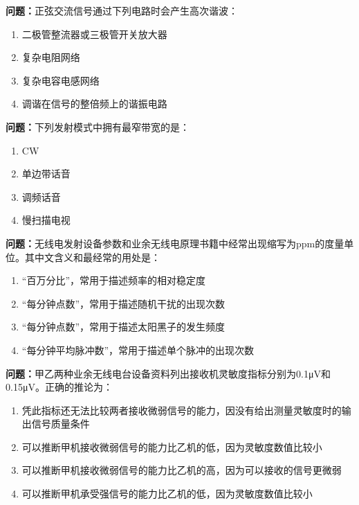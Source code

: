 \bigskip


\noindent\textbf{问题：}正弦交流信号通过下列电路时会产生高次谐波：
\begin{enumerate}[label=\Alph*), leftmargin=3em]
\item 二极管整流器或三极管开关放大器
\item 复杂电阻网络
\item 复杂电容电感网络
\item 调谐在信号的整倍频上的谐振电路
\end{enumerate}

\bigskip


\noindent\textbf{问题：}下列发射模式中拥有最窄带宽的是：
\begin{enumerate}[label=\Alph*), leftmargin=3em]
\item CW
\item 单边带话音
\item 调频话音
\item 慢扫描电视
\end{enumerate}

\bigskip


\noindent\textbf{问题：}无线电发射设备参数和业余无线电原理书籍中经常出现缩写为ppm的度量单位。其中文含义和最经常的用处是：
\begin{enumerate}[label=\Alph*), leftmargin=3em]
\item “百万分比”，常用于描述频率的相对稳定度
\item “每分钟点数”，常用于描述随机干扰的出现次数
\item “每分钟点数”，常用于描述太阳黑子的发生频度
\item “每分钟平均脉冲数”，常用于描述单个脉冲的出现次数
\end{enumerate}

\bigskip


\noindent\textbf{问题：}甲乙两种业余无线电台设备资料列出接收机灵敏度指标分别为0.1μV和0.15μV。正确的推论为：
\begin{enumerate}[label=\Alph*), leftmargin=3em]
\item 凭此指标还无法比较两者接收微弱信号的能力，因没有给出测量灵敏度时的输出信号质量条件
\item 可以推断甲机接收微弱信号的能力比乙机的低，因为灵敏度数值比较小
\item 可以推断甲机接收微弱信号的能力比乙机的高，因为可以接收的信号更微弱
\item 可以推断甲机承受强信号的能力比乙机的低，因为灵敏度数值比较小
\end{enumerate}


